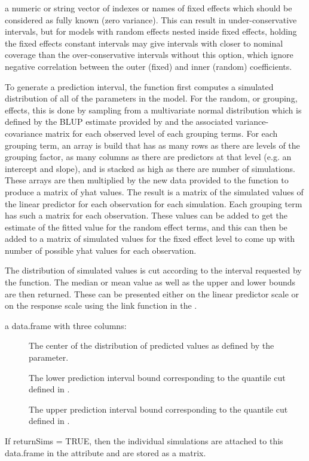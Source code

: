 \documentclass[letterpaper]{book}
\begin{document}
\begin{Arguments}
\begin{ldescription}
\item[\code{ignore.fixed.terms}] a numeric or string vector of indexes or names of
fixed effects which should be considered as fully known (zero variance). This
can result in under-conservative intervals, but for models with random effects
nested inside fixed effects, holding the fixed effects constant intervals may
give intervals with closer to nominal coverage than the over-conservative
intervals without this option, which ignore negative correlation between the
outer (fixed) and inner (random) coefficients.
\end{ldescription}
\end{Arguments}
%
\begin{Details}\relax
To generate a prediction interval, the function first computes a simulated
distribution of all of the parameters in the model. For the random, or grouping,
effects, this is done by sampling from a multivariate normal distribution which
is defined by the BLUP estimate provided by  and the associated
variance-covariance matrix for each observed level of each grouping terms. For
each grouping term, an array is build that has as many rows as there are levels
of the grouping factor, as many columns as there are predictors at that level
(e.g. an intercept and slope), and is stacked as high as there are number of
simulations. These arrays are then multiplied by the new data provided to the
function to produce a matrix of yhat values. The result is a matrix of the simulated
values of the linear predictor for each observation for each simulation. Each
grouping term has such a matrix for each observation. These values can be added
to get the estimate of the fitted value for the random effect terms, and this
can then be added to a matrix of simulated values for the fixed effect level to
come up with  number of possible yhat values for each observation.

The distribution of simulated values is cut according to the interval requested
by the function. The median or mean value as well as the upper and lower bounds
are then returned. These can be presented either on the linear predictor scale
or on the response scale using the link function in the .
\end{Details}
%
\begin{Value}
a data.frame with three columns:
\begin{description}

\item[] The center of the distribution of predicted values as defined by
the  parameter.
\item[] The lower prediction interval bound corresponding to the quantile cut
defined in .
\item[] The upper prediction interval bound corresponding to the quantile cut
defined in .

\end{description}

If returnSims = TRUE, then the individual simulations are attached to this
data.frame in the attribute  and are stored as a matrix.
\end{Value}
\end{document}
